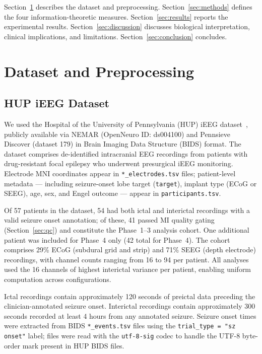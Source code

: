 \documentclass[final,5p,times,twocolumn]{elsarticle}
\begin{document}
Section~\ref{sec:data} describes the dataset and preprocessing.
Section~\ref{sec:methods} defines the four information-theoretic
measures.
Section~\ref{sec:results} reports the experimental results.
Section~\ref{sec:discussion} discusses biological interpretation,
clinical implications, and limitations.
Section~\ref{sec:conclusion} concludes.

\section{Dataset and Preprocessing}
\label{sec:data}

\subsection{HUP iEEG Dataset}

We used the Hospital of the University of Pennsylvania (HUP) iEEG
dataset~\cite{kini2016}, publicly available via NEMAR (OpenNeuro ID:
ds004100) and Pennsieve Discover (dataset 179) in Brain Imaging Data
Structure (BIDS) format.
%
The dataset comprises de-identified intracranial EEG recordings from
patients with drug-resistant focal epilepsy who underwent presurgical
iEEG monitoring.
%
Electrode MNI coordinates appear in \texttt{*\_electrodes.tsv} files;
patient-level metadata --- including seizure-onset lobe target
(\texttt{target}), implant type (ECoG or SEEG), age, sex, and Engel
outcome --- appear in \texttt{participants.tsv}.

Of 57 patients in the dataset, 54 had both ictal and interictal
recordings with a valid seizure onset annotation; of these, 41 passed
MI quality gating (Section~\ref{sec:qc}) and constitute the Phase~1--3
analysis cohort.
%
One additional patient was included for Phase~4 only (42 total for
Phase~4).
%
The cohort comprises 29\% ECoG (subdural grid and strip) and 71\% SEEG
(depth electrode) recordings, with channel counts ranging from 16 to 94
per patient.
%
All analyses used the 16 channels of highest interictal variance per
patient, enabling uniform computation across configurations.

Ictal recordings contain approximately 120 seconds of preictal data
preceding the clinician-annotated seizure onset.
%
Interictal recordings contain approximately 300 seconds recorded at
least 4 hours from any annotated seizure.
%
Seizure onset times were extracted from BIDS \texttt{*\_events.tsv}
files using the \texttt{trial\_type = "sz onset"} label; files were
read with the \texttt{utf-8-sig} codec to handle the UTF-8 byte-order
mark present in HUP BIDS files.
\end{document}

